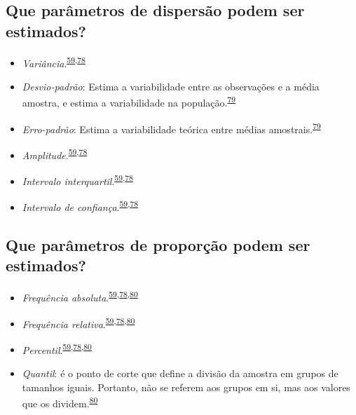 \documentclass[
  a4paper,
]{book}
\begin{document}
\hypertarget{que-paruxe2metros-de-dispersuxe3o-podem-ser-estimados}{%
\subsection{Que parâmetros de dispersão podem ser estimados?}\label{que-paruxe2metros-de-dispersuxe3o-podem-ser-estimados}}

\begin{itemize}
\item
  \emph{Variância}.\textsuperscript{\protect\hyperlink{ref-Ali2016}{59},\protect\hyperlink{ref-kanji2006}{78}}
\item
  \emph{Desvio-padrão}: Estima a variabilidade entre as observações e a média amostra, e estima a variabilidade na população.\textsuperscript{\protect\hyperlink{ref-Curran-Everett2008}{79}}
\item
  \emph{Erro-padrão}: Estima a variabilidade teórica entre médias amostrais.\textsuperscript{\protect\hyperlink{ref-Curran-Everett2008}{79}}
\item
  \emph{Amplitude}.\textsuperscript{\protect\hyperlink{ref-Ali2016}{59},\protect\hyperlink{ref-kanji2006}{78}}
\item
  \emph{Intervalo interquartil}.\textsuperscript{\protect\hyperlink{ref-Ali2016}{59},\protect\hyperlink{ref-kanji2006}{78}}
\item
  \emph{Intervalo de confiança}.\textsuperscript{\protect\hyperlink{ref-Ali2016}{59},\protect\hyperlink{ref-kanji2006}{78}}
\end{itemize}

\hypertarget{que-paruxe2metros-de-proporuxe7uxe3o-podem-ser-estimados}{%
\subsection{Que parâmetros de proporção podem ser estimados?}\label{que-paruxe2metros-de-proporuxe7uxe3o-podem-ser-estimados}}

\begin{itemize}
\item
  \emph{Frequência absoluta}.\textsuperscript{\protect\hyperlink{ref-Ali2016}{59},\protect\hyperlink{ref-kanji2006}{78},\protect\hyperlink{ref-Altman1994}{80}}
\item
  \emph{Frequência relativa}.\textsuperscript{\protect\hyperlink{ref-Ali2016}{59},\protect\hyperlink{ref-kanji2006}{78},\protect\hyperlink{ref-Altman1994}{80}}
\item
  \emph{Percentil}.\textsuperscript{\protect\hyperlink{ref-Ali2016}{59},\protect\hyperlink{ref-kanji2006}{78},\protect\hyperlink{ref-Altman1994}{80}}
\item
  \emph{Quantil}: é o ponto de corte que define a divisão da amostra em grupos de tamanhos iguais. Portanto, não se referem aos grupos em si, mas aos valores que os dividem.\textsuperscript{\protect\hyperlink{ref-Altman1994}{80}}
\end{itemize}
\end{document}
